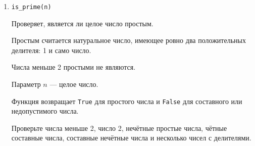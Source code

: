 \begin{enumerate}
Проверка кратности 15 должна иметь приоритет над отдельной проверкой
кратности 3 или 5.

Для $n\leq0$ функция возвращает пустой список.

Проверьте значения до первой замены, значения, кратные только 3,
только 5 и одновременно 3 и 5, а также границу диапазона.

\item \texttt{is\_prime(n)}

Проверяет, является ли целое число простым.

Простым считается натуральное число, имеющее ровно два положительных
делителя: 1 и само число.

Числа меньше 2 простыми не являются.

Параметр $n$ --- целое число.

Функция возвращает \texttt{True} для простого числа и \texttt{False}
для составного или недопустимого числа.

Проверьте числа меньше 2, число 2, нечётные простые числа, чётные
составные числа, составные нечётные числа и несколько чисел с делителями.

\end{enumerate}